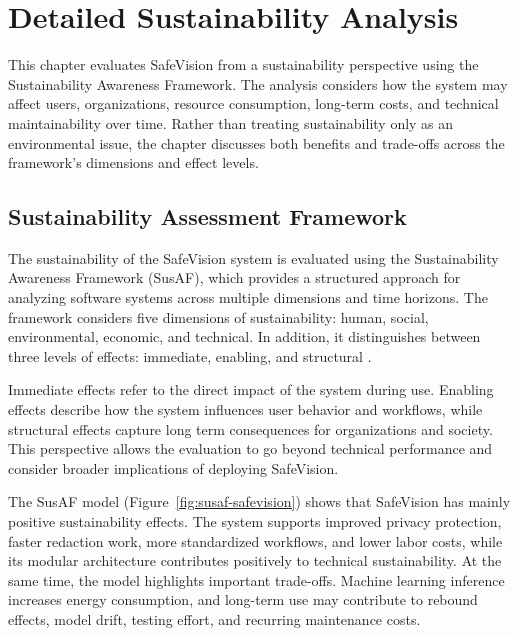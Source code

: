 \chapter{Detailed Sustainability Analysis}
\label{app:sustainability_analysis}

This chapter evaluates SafeVision from a sustainability perspective using the Sustainability Awareness Framework. The analysis considers how the system may affect users, organizations, resource consumption, long-term costs, and technical maintainability over time. Rather than treating sustainability only as an environmental issue, the chapter discusses both benefits and trade-offs across the framework’s dimensions and effect levels.

\section{Sustainability Assessment Framework}

The sustainability of the SafeVision system is evaluated using the Sustainability Awareness Framework (SusAF), which provides a structured approach for analyzing software systems across multiple dimensions and time horizons. The framework considers five dimensions of sustainability: human, social, environmental, economic, and technical. In addition, it distinguishes between three levels of effects: immediate, enabling, and structural \cite{penzenstadler2013sustainability}.

Immediate effects refer to the direct impact of the system during use. Enabling effects describe how the system influences user behavior and workflows, while structural effects capture long term consequences for organizations and society. This perspective allows the evaluation to go beyond technical performance and consider broader implications of deploying SafeVision.

The SusAF model (Figure~\ref{fig:susaf-safevision}) shows that SafeVision has mainly positive sustainability effects. The system supports improved privacy protection, faster redaction work, more standardized workflows, and lower labor costs, while its modular architecture contributes positively to technical sustainability. At the same time, the model highlights important trade-offs. Machine learning inference increases energy consumption, and long-term use may contribute to rebound effects, model drift, testing effort, and recurring maintenance costs.



